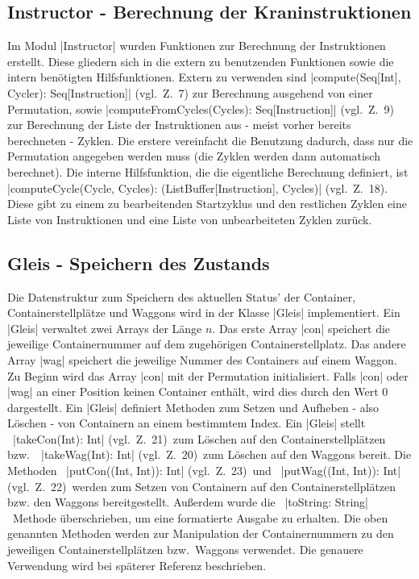 \subsection{Instructor - Berechnung der Kraninstruktionen}
Im Modul |Instructor| wurden Funktionen zur Berechnung der Instruktionen erstellt.
Diese gliedern sich in die extern zu benutzenden Funktionen sowie die intern benötigten Hilfsfunktionen.
Extern zu verwenden sind |compute(Seq[Int], Cycler): Seq[Instruction]| (vgl.\ Z.\ 7) zur Berechnung ausgehend von einer Permutation,
sowie |computeFromCycles(Cycles): Seq[Instruction]| (vgl.\ Z.\ 9) zur Berechnung der Liste der Instruktionen aus - meist vorher bereits berechneten - Zyklen.
Die erstere vereinfacht die Benutzung dadurch, dass nur die Permutation angegeben werden muss (die Zyklen werden dann automatisch berechnet).
Die interne Hilfsfunktion, die die eigentliche Berechnung definiert, ist |computeCycle(Cycle, Cycles): (ListBuffer[Instruction], Cycles)| (vgl.\ Z.\ 18).
Diese gibt zu einem zu bearbeitenden Startzyklus und den restlichen Zyklen eine Liste von Instruktionen und eine Liste von unbearbeiteten Zyklen zurück.

\subsection{Gleis - Speichern des Zustands}
\label{gleis}
Die Datenstruktur zum Speichern des aktuellen Status' der Container, Containerstellplätze und Waggons wird in der Klasse |Gleis| implementiert.
Ein |Gleis| verwaltet zwei Arrays der Länge $n$. Das erste Array |con| speichert die jeweilige Containernummer auf dem zugehörigen Containerstellplatz.
Das andere Array |wag| speichert die jeweilige Nummer des Containers auf einem Waggon.
Zu Beginn wird das Array |con| mit der Permutation initialisiert.
Falls |con| oder |wag| an einer Position keinen Container enthält, wird dies durch den Wert 0 dargestellt.
Ein |Gleis| definiert Methoden zum Setzen und Aufheben - also Löschen - von Containern an einem bestimmtem Index.
Ein |Gleis| stellt \ |takeCon(Int): Int| (vgl.\ Z.\ 21)\  zum Löschen auf den Containerstellplätzen bzw.\ \ |takeWag(Int): Int| (vgl.\ Z.\ 20)\  zum Löschen auf den Waggons bereit.
Die Methoden \ |putCon((Int, Int)): Int| (vgl.\ Z.\ 23)\  und \ |putWag((Int, Int)): Int| (vgl.\ Z.\ 22)\  werden zum Setzen von Containern auf den Containerstellplätzen bzw. den Waggons bereitgestellt.
Außerdem wurde die \ |toString: String|\  Methode über\-schrie\-ben, um eine formatierte Ausgabe zu erhalten.
Die oben genannten Methoden werden zur Manipulation der Containernummern zu den jeweiligen Containerstellplätzen bzw.\ Waggons verwendet.
Die genauere Verwendung wird bei späterer Referenz beschrieben.

